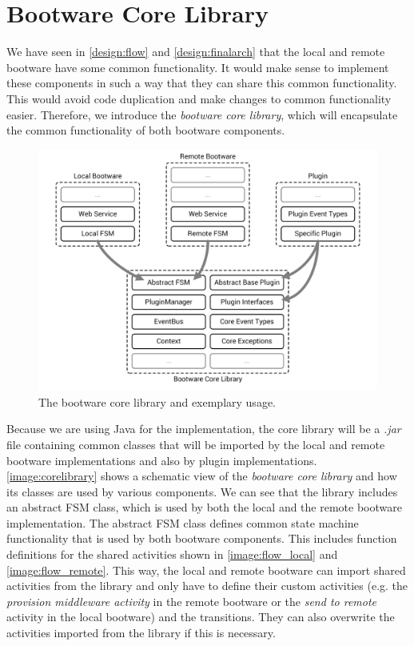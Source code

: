 \section{Bootware Core Library}

We have seen in \autoref{design:flow} and \autoref{design:finalarch} that the local and remote bootware have some common functionality.
It would make sense to implement these components in such a way that they can share this common functionality.
This would avoid code duplication and make changes to common functionality easier.
Therefore, we introduce the \textit{bootware core library}, which will encapsulate the common functionality of both bootware components.

\begin{figure}[!htbp]
	\centering
	\includegraphics[resolution=600]{implementation/assets/core_library}
	\caption{The bootware core library and exemplary usage.}
	\label{image:corelibrary}
\end{figure}

Because we are using Java for the implementation, the core library will be a \textit{.jar} file containing common classes that will be imported by the local and remote bootware implementations and also by plugin implementations.
\autoref{image:corelibrary} shows a schematic view of the \textit{bootware core library} and how its classes are used by various components.
We can see that the library includes an abstract FSM class, which is used by both the local and the remote bootware implementation.
The abstract FSM class defines common state machine functionality that is used by both bootware components.
This includes function definitions for the shared activities shown in \autoref{image:flow_local} and \autoref{image:flow_remote}.
This way, the local and remote bootware can import shared activities from the library and only have to define their custom activities (e.g. the \textit{provision middleware activity} in the remote bootware or the \textit{send to remote} activity in the local bootware) and the transitions.
They can also overwrite the activities imported from the library if this is necessary.

